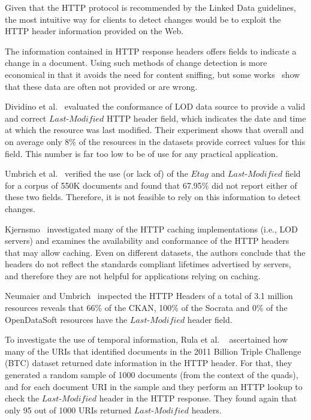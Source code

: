 \documentclass[sw]{iosart2x}
\begin{document}
Given that the HTTP protocol is recommended by the Linked Data guidelines, the most intuitive way for clients to detect changes would be to exploit the HTTP header information provided on the Web.

The information contained in HTTP response headers offers fields to indicate a change in a document. Using such methods of change detection is more economical in that it avoids the need for content sniffing, but some works~\cite{UmbrichHHPD10, DividinoKG14, Kjernsmo15, NeumaierU16} show that these data are often not provided or are wrong.

Dividino et al.~\cite{DividinoKG14} evaluated the conformance of LOD data source to provide a valid and correct $Last$-$Modified$ HTTP header field, which indicates the date and time at which the resource was last modified. Their experiment shows that overall and on average only 8\% of the resources in the datasets provide correct values for this field. This number is far too low to be of use for any practical application.

Umbrich et al.~\cite{UmbrichHHPD10} verified the use (or lack of) of the $Etag$ and $Last$-$Modified$ field for a corpus of 550K documents and found that 67.95\% did not report either of these two fields. Therefore, it is not feasible to rely on this information to detect changes.

Kjernsmo~\cite{Kjernsmo15} investigated many of the HTTP caching implementations (i.e., LOD servers) and examines the availability and conformance of the HTTP headers that may allow caching. Even on different datasets, the authors conclude that the headers do not reflect the standards compliant lifetimes advertised by servers, and therefore they are not helpful for applications relying on caching.

Neumaier and Umbrich~\cite{NeumaierU16} inspected the HTTP Headers of a total of 3.1 million resources reveals that 66\% of the CKAN, 100\% of the Socrata and 0\% of the OpenDataSoft resources have the $Last$-$Modified$ header field.

To investigate the use of temporal information, Rula et al. ~\cite{RulaPHSM12} ascertained how many of the URIs that identified documents in the 2011 Billion Triple Challenge (BTC) dataset returned date information in the HTTP header. For that, they generated a random sample of 1000 documents (from the context of the quads), and for each document URI in the sample and they perform an HTTP lookup to check the $Last$-$Modified$ header in the HTTP response. They found again that only 95 out of 1000 URIs returned $Last$-$Modified$ headers.  
\end{document}
